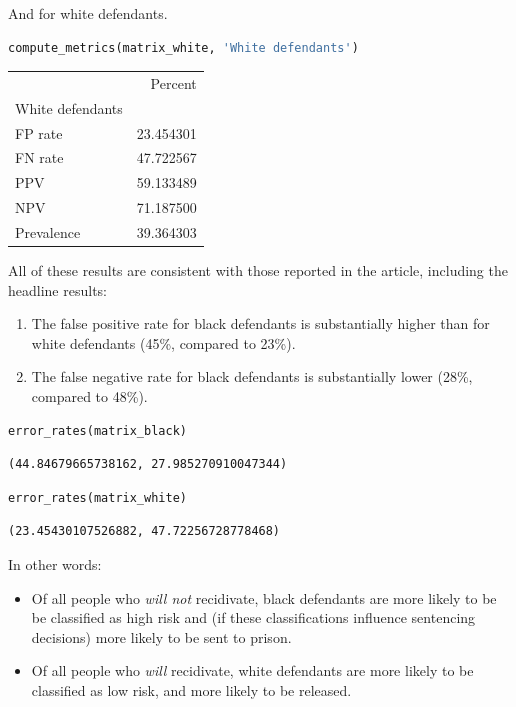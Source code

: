 And for white defendants.

\begin{lstlisting}[language=Python,style=source]
compute_metrics(matrix_white, 'White defendants')
\end{lstlisting}

\begin{tabular}{lr}
\toprule
{} &    Percent \\
White defendants &            \\
\midrule
FP rate          &  23.454301 \\
FN rate          &  47.722567 \\
PPV              &  59.133489 \\
NPV              &  71.187500 \\
Prevalence       &  39.364303 \\
\bottomrule
\end{tabular}

All of these results are consistent with those reported in the article,
including the headline results:

\begin{enumerate}
\def\labelenumi{\arabic{enumi}.}
\item
  The false positive rate for black defendants is substantially higher
  than for white defendants (45\%, compared to 23\%).
\item
  The false negative rate for black defendants is substantially lower
  (28\%, compared to 48\%).
\end{enumerate}

\begin{lstlisting}[language=Python,style=source]
error_rates(matrix_black)
\end{lstlisting}

\begin{lstlisting}[style=output]
(44.84679665738162, 27.985270910047344)
\end{lstlisting}

\begin{lstlisting}[language=Python,style=source]
error_rates(matrix_white)
\end{lstlisting}

\begin{lstlisting}[style=output]
(23.45430107526882, 47.72256728778468)
\end{lstlisting}

In other words:

\begin{itemize}
\item
  Of all people who \emph{will not} recidivate, black defendants are
  more likely to be be classified as high risk and (if these
  classifications influence sentencing decisions) more likely to be sent
  to prison.
\item
  Of all people who \emph{will} recidivate, white defendants are more
  likely to be classified as low risk, and more likely to be released.
\end{itemize}

